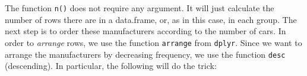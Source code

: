 \documentclass[]{tufte-book}
\newenvironment{Shaded}{}{}
\newcommand{\DataTypeTok}[1]{\textcolor[rgb]{0.56,0.13,0.00}{#1}}
\newcommand{\KeywordTok}[1]{\textcolor[rgb]{0.00,0.44,0.13}{\textbf{#1}}}
\newcommand{\NormalTok}[1]{#1}
\newcommand{\OperatorTok}[1]{\textcolor[rgb]{0.40,0.40,0.40}{#1}}
\newcommand{\StringTok}[1]{\textcolor[rgb]{0.25,0.44,0.63}{#1}}
\begin{document}
The function \texttt{n()} does not require any argument. It will just calculate the number of rows there are in a data.frame, or, as in this case, in each group. The next step is to order these manufacturers according to the number of cars. In order to \emph{arrange} rows, we use the function \texttt{arrange} from \texttt{dplyr}. Since we want to arrange the manufacturers by decreasing frequency, we use the function \texttt{desc} (descending). In particular, the following will do the trick:

\begin{Shaded}
\end{Shaded}
\end{document}
